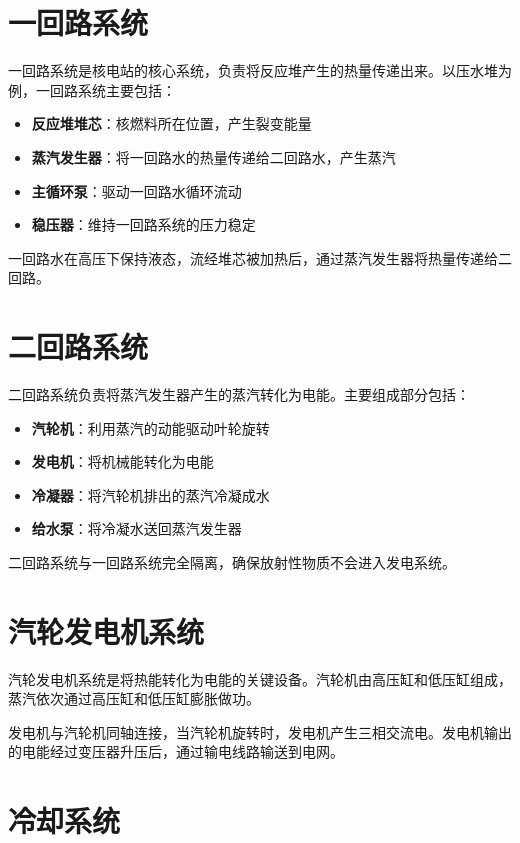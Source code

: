 \documentclass[12pt,UTF8]{ctexbook}
\begin{document}
\section{一回路系统}

一回路系统是核电站的核心系统，负责将反应堆产生的热量传递出来。以压水堆为例，一回路系统主要包括：

\begin{itemize}[leftmargin=2cm]
    \item \textbf{反应堆堆芯}：核燃料所在位置，产生裂变能量
    \item \textbf{蒸汽发生器}：将一回路水的热量传递给二回路水，产生蒸汽
    \item \textbf{主循环泵}：驱动一回路水循环流动
    \item \textbf{稳压器}：维持一回路系统的压力稳定
\end{itemize}

一回路水在高压下保持液态，流经堆芯被加热后，通过蒸汽发生器将热量传递给二回路。

\section{二回路系统}

二回路系统负责将蒸汽发生器产生的蒸汽转化为电能。主要组成部分包括：

\begin{itemize}[leftmargin=2cm]
    \item \textbf{汽轮机}：利用蒸汽的动能驱动叶轮旋转
    \item \textbf{发电机}：将机械能转化为电能
    \item \textbf{冷凝器}：将汽轮机排出的蒸汽冷凝成水
    \item \textbf{给水泵}：将冷凝水送回蒸汽发生器
\end{itemize}

二回路系统与一回路系统完全隔离，确保放射性物质不会进入发电系统。

\section{汽轮发电机系统}

汽轮发电机系统是将热能转化为电能的关键设备。汽轮机由高压缸和低压缸组成，蒸汽依次通过高压缸和低压缸膨胀做功。

发电机与汽轮机同轴连接，当汽轮机旋转时，发电机产生三相交流电。发电机输出的电能经过变压器升压后，通过输电线路输送到电网。

\section{冷却系统}
\end{document}
